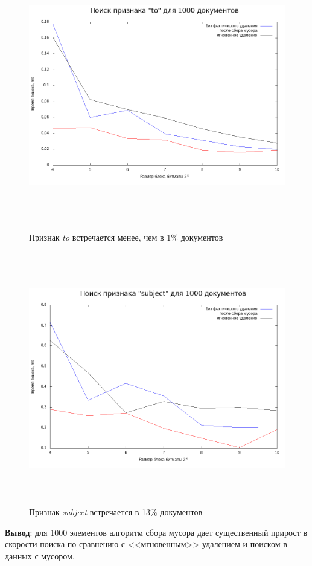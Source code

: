 \begin{figure}[H]
\includegraphics[width=\linewidth, height=11cm]{fig/limit_1e6/1e3/to_time.png}
\caption{Признак \textit{to} встречается менее, чем в 1\% документов}
\includegraphics[width=\linewidth, height=11cm]{fig/limit_1e6/1e3/subject_time.png}
\caption{Признак \textit{subject} встречается в 13\% документов}
\end{figure}

\textbf{Вывод}: для 1000 элементов алгоритм сбора мусора дает существенный
прирост в скорости поиска по сравнению с <<мгновенным>> удалением и поиском в данных с мусором.

